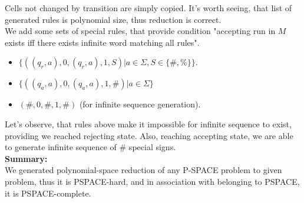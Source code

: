 \documentclass[12pt]{article}
\begin{document}
\begin{enumerate}
Cells not changed by transition are simply copied.
It's worth seeing, that list of generated rules is polynomial size, thus reduction is correct. \\  

We add some sets of special rules, that provide condition "accepting run in $M$ exists iff there exists infinite word matching all rules". 
\begin{itemize}
    \item $ \{((q_r, a), 0, (q_r, a), 1, S ) \rvert a \in \Sigma, S \in \{ \#, \%\} \}$.
    \item $ \{((q_a, a), 0, (q_a, a), 1, \#) \rvert  a \in \Sigma\}$
    \item $(\#, 0, \#, 1, \# )$ (for infinite sequence generation).
\end{itemize}

Let's observe, that rules above make it impossible for infinite sequence to exist, providing we reached rejecting state. Also, reaching accepting state, we are able to generate infinite sequence of \# special signs. \\

\textbf{Summary:} \\ 
We generated polynomial-space reduction of any P-SPACE problem to given problem, thus
it is PSPACE-hard, and in association with belonging to PSPACE, it is PSPACE-complete.


\end{enumerate}
\end{document}
